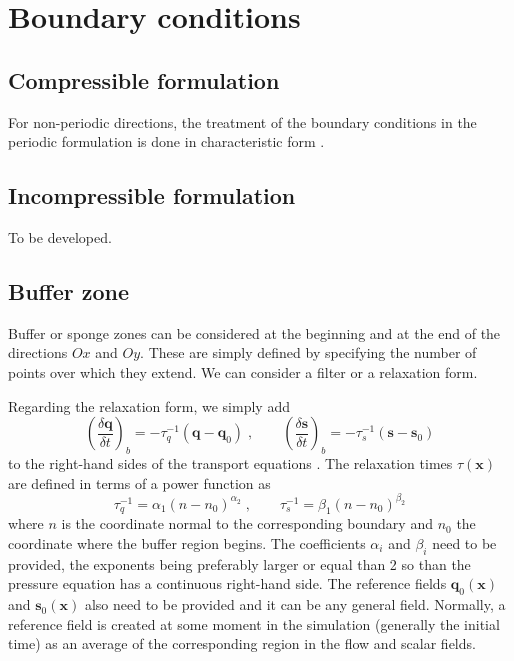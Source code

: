 \section{Boundary conditions}

\subsection{Compressible formulation}

For non-periodic directions, the treatment of the boundary conditions in the
periodic formulation is done in characteristic form
\citep{Thompson:1987,Thompson:1990,Lodato:2008}.

\subsection{Incompressible formulation}

To be developed.

\subsection{Buffer zone}\label{sec:buffer}

Buffer or sponge zones can be considered at the beginning and at the end of the
directions $Ox$ and $Oy$. These are simply defined by specifying the number of
points over which they extend. We can consider a filter or a relaxation form.

Regarding the relaxation form, we simply add
\begin{equation}
\left(\frac{\delta \mathbf{q}}{\delta t}\right)_b=-\tau_q^{-1}(\mathbf{q}-\mathbf{q}_0)
\;,\qquad
\left(\frac{\delta \mathbf{s}}{\delta t}\right)_b=-\tau_s^{-1}(\mathbf{s}-\mathbf{s}_0)
\end{equation}
to the right-hand sides of the transport equations \citep{Hu:1996b}.  The
relaxation times $\tau(\mathbf{x})$ are defined in terms of a power function as
\begin{equation}
  \tau_q^{-1}=\alpha_1(n-n_0)^{\alpha_2} \;,\qquad
  \tau_s^{-1}=\beta_1(n-n_0)^{\beta_2}
\end{equation}
where $n$ is the coordinate normal to the corresponding boundary and $n_0$ the
coordinate where the buffer region begins. The coefficients $\alpha_i$ and
$\beta_i$ need to be provided, the exponents being preferably larger or equal
than 2 so than the pressure equation has a continuous right-hand side.  The
reference fields $\mathbf{q}_0(\mathbf{x})$ and $\mathbf{s}_0(\mathbf{x})$ also
need to be provided and it can be any general field. Normally, a reference field
is created at some moment in the simulation (generally the initial time) as an
average of the corresponding region in the flow and scalar fields.

